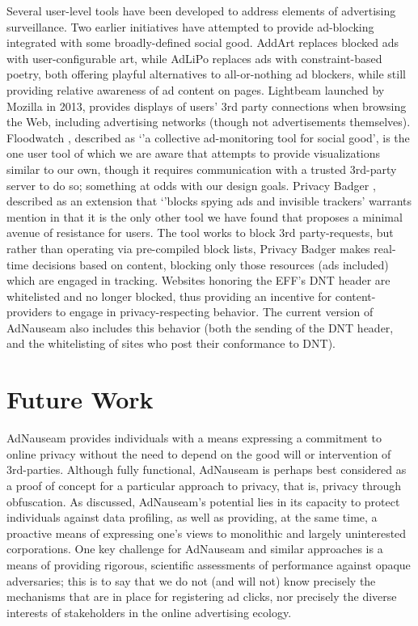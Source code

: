 \documentclass[conference]{IEEEtran}
\begin{document}
Several user-level tools have been developed to address elements of advertising surveillance. Two earlier initiatives have attempted to provide ad-blocking integrated with some broadly-defined social good. AddArt \cite{AddArt} replaces blocked ads with user-configurable art, while AdLiPo \cite{Howe-0} replaces ads with constraint-based poetry, both offering playful alternatives to all-or-nothing ad blockers, while still providing relative awareness of ad content on pages. Lightbeam \cite{Mozilla} launched by Mozilla in 2013, provides displays of users' 3rd party connections when browsing the Web, including advertising networks (though not advertisements themselves). Floodwatch \cite{Floodwatch}, described as `'a collective ad-monitoring tool for social good', is the one user tool of which we are aware that attempts to provide visualizations similar to our own, though it requires communication with a trusted 3rd-party server to do so; something at odds with our design goals. Privacy Badger \cite{EFF}, described as an extension that `'blocks spying ads and invisible trackers' warrants mention in that it is the only other tool we have found that proposes a minimal avenue of resistance for users. The tool works to block 3rd party-requests, but rather than operating via pre-compiled block lists, Privacy Badger makes real-time decisions based on content, blocking only those resources (ads included) which are engaged in tracking. Websites honoring the EFF's DNT header are whitelisted and no longer blocked, thus providing an incentive for content-providers to engage in privacy-respecting behavior. The current version of AdNauseam also includes this behavior (both the sending of the DNT header, and the whitelisting of sites who post their conformance to DNT).


\section{Future Work}

AdNauseam provides individuals with a means expressing a commitment to online privacy without the need to depend on the good will or intervention of 3rd-parties. Although fully functional, AdNauseam is perhaps best considered as a proof of concept for a particular approach to privacy, that is, privacy through obfuscation. As discussed, AdNauseam's potential lies in its capacity to protect individuals against data profiling, as well as providing, at the same time, a proactive means of expressing one's views to monolithic and largely uninterested corporations.
One key challenge for AdNauseam and similar approaches is a means of providing rigorous, scientific assessments of performance against opaque adversaries; this is to say that we do not (and will not) know precisely the mechanisms that are in place for registering ad clicks, nor precisely the diverse interests of stakeholders in the online advertising ecology.
\end{document}
